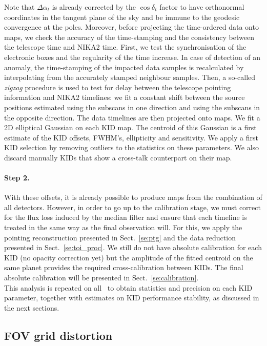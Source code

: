 Note that $\Delta\alpha_t$ is already corrected by the $\cos\delta_t$ factor to
have orthonormal coordinates in the tangent plane of the sky and be immune to
the geodesic convergence at the poles. Moreover, before projecting the
time-ordered data onto maps, we check
the accuracy of the time-stamping and the consistency between the
telescope time and NIKA2 time. First, we test the
synchronisation of the electronic boxes and the regularity of the
time increase. In case of detection of an anomaly, the
time-stamping of the impacted data samples is
recalculated by interpolating from the accurately stamped
neighbour samples. Then, a so-called \emph{zigzag}
procedure is used to test for delay between the telescope pointing
information and NIKA2 timelines: we fit a constant shift between the
source positions estimated using the subscans in one direction and
using the subscans in the opposite direction. The data timelines are
then projected onto maps. 
We fit a 2D elliptical Gaussian on
each KID map. The centroid of this Gaussian is a first estimate of the KID
offsets, FWHM's, ellipticity and sensitivity. We apply a first KID selection by
removing outliers to the statistics on these parameters. We also discard
manually KIDs that show a cross-talk counterpart on their map.

\paragraph{Step 2.} With these offsets, it is already possible to produce maps
from the combination of all detectors. However, in order to go up to
the calibration stage, we must correct for the flux loss induced by
the median filter and ensure that each timeline is treated in the same
way as the final observation will. For this, we apply the pointing
reconstruction presented in Sect.~\ref{se:ptg} and the data reduction
presented in Sect.~\ref{se:toi_proc}. We still do not have absolute
calibration for each KID (no opacity correction yet) but the amplitude
of the fitted centroid on the same planet provides the required
cross-calibration between KIDs. The final absolute calibration will be
presented in Sect.~\ref{se:calibration}.\\

This analysis is repeated on all \bms\ to obtain statistics and
precision on each KID parameter, together with estimates on KID
performance stability, as discussed in the next sections.

\subsection{FOV grid distortion}
\label{se:grid_distortion}

